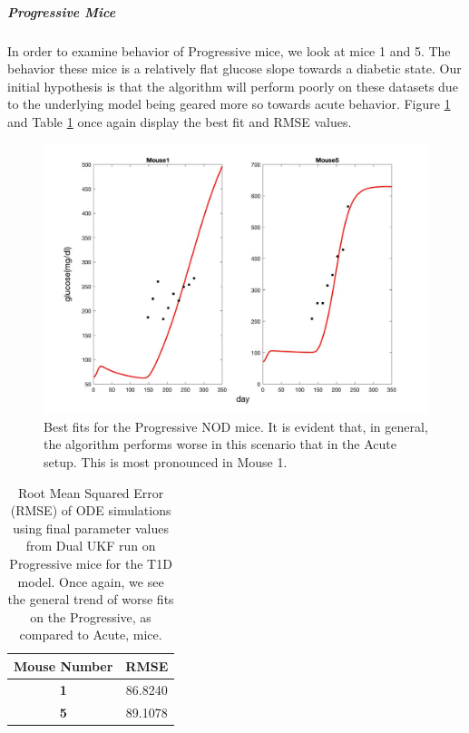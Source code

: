 \subparagraph{Progressive Mice}
In order to examine behavior of Progressive mice, we look at mice 1 and 5. The behavior these mice is a relatively flat glucose slope towards a diabetic state. Our initial hypothesis is that the algorithm will perform poorly on these datasets due to the underlying model being geared more so towards acute behavior. Figure \ref{fig:T1D_Dual_Progressive_Plots} and Table \ref{table:T1D_Dual_Progressive_RMSE} once again display the best fit and RMSE values.

\begin{figure}[H]
    \centering
    \includegraphics[width=15cm]{Kalman_Filter_Images/Dual_Progressive_Mouse_Fits.jpg}
    \caption{Best fits for the Progressive NOD mice. It is evident that, in general, the algorithm performs worse in this scenario that in the Acute setup. This is most pronounced in Mouse 1.}
    \label{fig:T1D_Dual_Progressive_Plots}
\end{figure}

\begin{table}[H]
  \begin{center}

    \begin{tabular}{c|c} %
      \textbf{Mouse Number} & \textbf{RMSE} \\
      \hline
      \textbf{1} & 86.8240\\
      \textbf{5} & 89.1078
    \end{tabular}
    \caption{Root Mean Squared Error (RMSE) of ODE simulations using final parameter values from Dual UKF run on Progressive mice for the T1D model. Once again, we see the general trend of worse fits on the Progressive, as compared to Acute, mice.}
    \label{table:T1D_Dual_Progressive_RMSE}
  \end{center}
\end{table}


